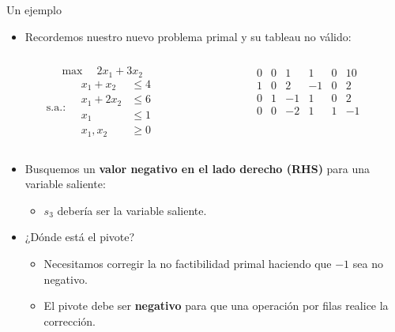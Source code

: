\documentclass{beamer}
\begin{document}
\begin{frame}{Un ejemplo}
    \begin{itemize}
        \item Recordemos nuestro nuevo problema primal y su tableau no válido:
    \end{itemize}
\begin{columns}
    \begin{column}{0.5\textwidth}
    \[
    \max \quad 2x_1 + 3x_2
    \]
    \[
    \text{s.a.:} \quad
    \begin{aligned}
        x_1 + x_2 &\leq 4 \\
        x_1 + 2x_2 &\leq 6 \\
        x_1 &\leq 1 \\
        x_1, x_2 &\geq 0
    \end{aligned}
    \]        
    \end{column}
    \begin{column}{0.5\textwidth}
    \[
    \begin{array}{ccccc|c}
        0 & 0 & 1 & 1 & 0 & 10 \\
        \hline
        1 & 0 & 2 & -1 & 0 & 2 \\
        0 & 1 & -1 & 1 & 0 & 2 \\
        0 & 0 & -2 & 1 & 1 & -1
    \end{array}
    \]        
    \end{column}

\end{columns}

    \begin{itemize}
        \item Busquemos un \textbf{valor negativo en el lado derecho (RHS)} para una variable saliente:
        \begin{itemize}
            \item \( s_3 \) debería ser la variable saliente.
        \end{itemize}

        \item ¿Dónde está el pivote?
        \begin{itemize}
            \item Necesitamos corregir la no factibilidad primal haciendo que \(-1\) sea no negativo.
            \item El pivote debe ser \textbf{negativo} para que una operación por filas realice la corrección.
        \end{itemize}
    \end{itemize}
\end{frame}
\end{document}
